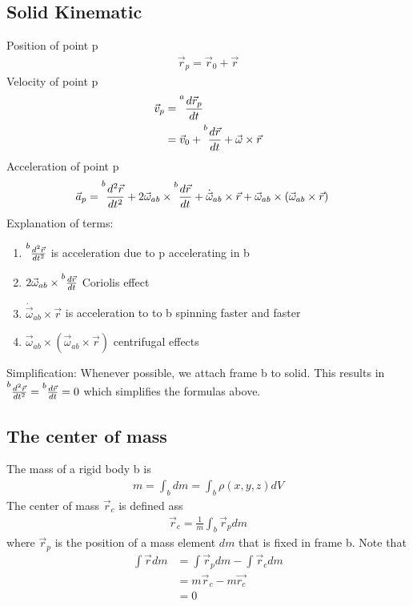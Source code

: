 \subsection{Solid Kinematic}
Position of point p
\begin{align}
    \Vec{r}_p=\Vec{r}_0 + \Vec{r}
\end{align}
Velocity of point p
\begin{align}
    \Vec{v}_p & = \prescript{a}{}{\frac{d\Vec{r}_p}{dt}} \\
    & = \Vec{v}_0 + \prescript{b}{}{\frac{d\Vec{r}}{dt}}+\Vec{\omega}\times\Vec{r}
\end{align}
Acceleration of point p
\begin{align}
    \Vec{a}_p & = \prescript{b}{}{\frac{d^2\Vec{r}}{dt^2}}+2\Vec{\omega}_{ab}\times\prescript{b}{}{\frac{d\Vec{r}}{dt}}+\Dot{\Vec{\omega}}_{ab}\times\Vec{r}+\Vec{\omega}_{ab}\times(\Vec{\omega}_{ab}\times\Vec{r})
\end{align}
Explanation of terms:
\begin{enumerate}
    \item $\prescript{b}{}{\frac{d^2\Vec{r}}{dt^2}}$ is acceleration due to p accelerating in b
    \item $2\Vec{\omega}_{ab}\times\prescript{b}{}{\frac{d\Vec{r}}{dt}}$ Coriolis effect
    \item $\Dot{\Vec{\omega}}_{ab}\times\Vec{r}$ is acceleration to to b spinning faster and faster
    \item $\Vec{\omega}_{ab}\times(\Vec{\omega}_{ab}\times\Vec{r})$ centrifugal effects
\end{enumerate}
Simplification: Whenever possible, we attach frame b to solid. This results in $\prescript{b}{}{\frac{d^2\Vec{r}}{dt^2}}=\prescript{b}{}{\frac{d\Vec{r}}{dt}}=0$ which simplifies the formulas above.

\subsection{The center of mass}
The mass of a rigid body b is 
\begin{align}
    m = \int_bdm = \int_b\rho(x,y,z)dV
\end{align}
The center of mass $\Vec{r}_c$ is defined ass
\begin{align}
    \Vec{r}_c = \frac{1}{m}\int_b\Vec{r}_pdm
\end{align}
where $\Vec{r}_p$ is the position of a mass element $dm$ that is fixed in frame b. Note that
\begin{align}
    \int\Vec{r}dm  &= \int\Vec{r}_pdm-\int\Vec{r}_cdm \\
    &= m\Vec{r}_c-m\Vec{r_c} \\
    &=0
\end{align}

